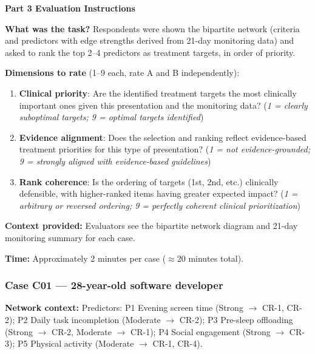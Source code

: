 \documentclass[11pt,a4paper]{article}
\begin{document}
\begin{tcolorbox}[colback=PartThreeBG,colframe=GoldAmber,arc=2.5mm,boxrule=0.9pt,left=10pt,right=10pt,top=9pt,bottom=9pt]
\textbf{\color{GoldAmber}Part 3 Evaluation Instructions}

\smallskip
\textbf{What was the task?} Respondents were shown the bipartite network (criteria and predictors with edge strengths derived from 21-day monitoring data) and asked to rank the top 2--4 predictors as treatment targets, in order of priority.

\textbf{Dimensions to rate} (1--9 each, rate A and B independently):
\begin{enumerate}
\item \textbf{Clinical priority}: Are the identified treatment targets the most clinically important ones given this presentation and the monitoring data? (\textit{1 = clearly suboptimal targets; 9 = optimal targets identified})
\item \textbf{Evidence alignment}: Does the selection and ranking reflect evidence-based treatment priorities for this type of presentation? (\textit{1 = not evidence-grounded; 9 = strongly aligned with evidence-based guidelines})
\item \textbf{Rank coherence}: Is the ordering of targets (1st, 2nd, etc.) clinically defensible, with higher-ranked items having greater expected impact? (\textit{1 = arbitrary or reversed ordering; 9 = perfectly coherent clinical prioritization})
\end{enumerate}

\textbf{Context provided:} Evaluators see the bipartite network diagram and 21-day monitoring summary for each case.

\textbf{Time:} Approximately 2 minutes per case ($\approx$20 minutes total).
\end{tcolorbox}

\vspace{0.5em}

\subsubsection*{Case C01 --- 28-year-old software developer}
\begin{vignettebox}
\small\textbf{Network context:} Predictors: P1 Evening screen time (Strong $\to$ CR-1, CR-2); P2 Daily task incompletion (Moderate $\to$ CR-2); P3 Pre-sleep offloading (Strong $\to$ CR-2, Moderate $\to$ CR-1); P4 Social engagement (Strong $\to$ CR-3); P5 Physical activity (Moderate $\to$ CR-1, CR-4).
\end{vignettebox}
\end{document}
